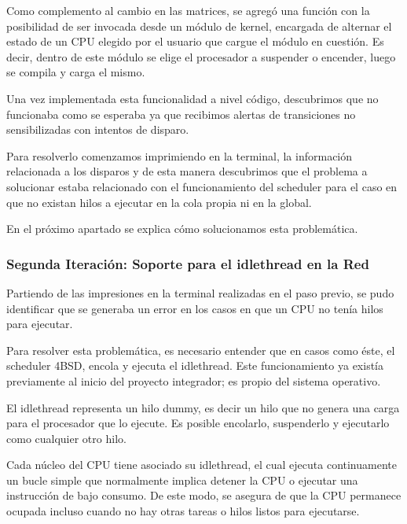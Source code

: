 Como complemento al cambio en las matrices, se agregó una función con la posibilidad de ser invocada desde un módulo de kernel, encargada de alternar el estado de un CPU elegido por el usuario que cargue el módulo en cuestión. Es decir, dentro de este módulo se elige el procesador a suspender o encender, luego se compila y carga el mismo.\par

Una vez implementada esta funcionalidad a nivel código, descubrimos que no funcionaba como se esperaba ya que recibimos alertas de transiciones no sensibilizadas con intentos de disparo.\par

Para resolverlo comenzamos imprimiendo en la terminal, la información relacionada a los disparos y  de esta manera descubrimos que el problema a solucionar estaba relacionado con el funcionamiento del scheduler para el caso en que no existan hilos a ejecutar en la cola propia ni en la global.\par

En el próximo apartado se explica cómo solucionamos esta problemática.\par


\subsubsection{Segunda Iteración: Soporte para el idlethread en la Red}

Partiendo de las impresiones en la terminal realizadas en el paso previo, se pudo identificar que se generaba un error en los casos en que un CPU no tenía hilos para ejecutar.\par

Para resolver esta problemática, es necesario entender que en casos como éste, el scheduler 4BSD, encola y ejecuta el idlethread. Este funcionamiento ya existía previamente al inicio del proyecto integrador; es propio del sistema operativo.\par

El idlethread representa un hilo dummy, es decir un hilo que no genera una carga para el procesador que lo ejecute. Es posible encolarlo, suspenderlo y ejecutarlo como cualquier otro hilo.\par

Cada núcleo del CPU tiene asociado su idlethread, el cual ejecuta continuamente un bucle simple que normalmente implica detener la CPU o ejecutar una instrucción de bajo consumo. De este modo, se asegura de que la CPU permanece ocupada incluso cuando no hay otras tareas o hilos listos para ejecutarse.\par

